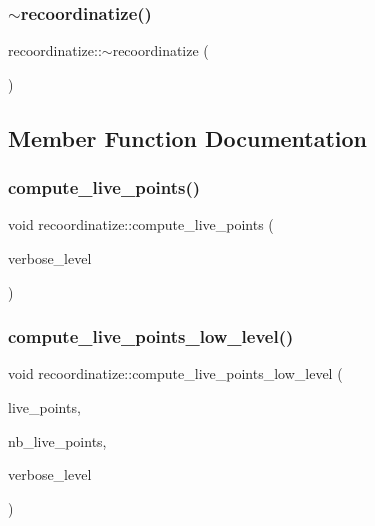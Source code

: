 \subsubsection{\texorpdfstring{$\sim$recoordinatize()}{~recoordinatize()}}
{\footnotesize\ttfamily recoordinatize\+::$\sim$recoordinatize (\begin{DoxyParamCaption}{ }\end{DoxyParamCaption})}



\subsection{Member Function Documentation}
\mbox{\label{classrecoordinatize_afa52f45535215f825be7e620bc44b7d7}} 
\subsubsection{\texorpdfstring{compute\+\_\+live\+\_\+points()}{compute\_live\_points()}}
{\footnotesize\ttfamily void recoordinatize\+::compute\+\_\+live\+\_\+points (\begin{DoxyParamCaption}\item[{\mbox{\hyperlink{galois_8h_a09fddde158a3a20bd2dcadb609de11dc}{I\+NT}}}]{verbose\+\_\+level }\end{DoxyParamCaption})}

\mbox{\label{classrecoordinatize_ac87da537e6ac771351b530475278253e}} 
\subsubsection{\texorpdfstring{compute\+\_\+live\+\_\+points\+\_\+low\+\_\+level()}{compute\_live\_points\_low\_level()}}
{\footnotesize\ttfamily void recoordinatize\+::compute\+\_\+live\+\_\+points\+\_\+low\+\_\+level (\begin{DoxyParamCaption}\item[{\mbox{\hyperlink{galois_8h_a09fddde158a3a20bd2dcadb609de11dc}{I\+NT}} $\ast$\&}]{live\+\_\+points,  }\item[{\mbox{\hyperlink{galois_8h_a09fddde158a3a20bd2dcadb609de11dc}{I\+NT}} \&}]{nb\+\_\+live\+\_\+points,  }\item[{\mbox{\hyperlink{galois_8h_a09fddde158a3a20bd2dcadb609de11dc}{I\+NT}}}]{verbose\+\_\+level }\end{DoxyParamCaption})}

